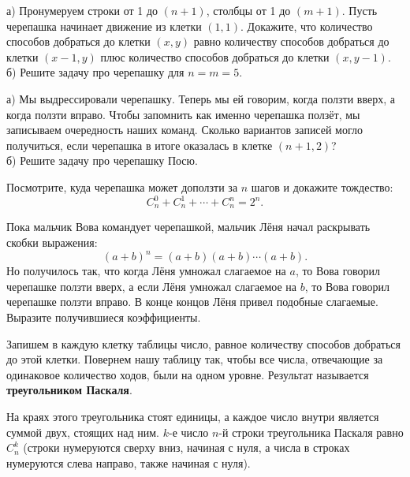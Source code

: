 \begin{problems}
 
\item а) Пронумеруем строки от 1 до $(n+1)$, столбцы от 1 до $(m+1)$. Пусть черепашка начинает движение из клетки $(1, 1)$. Докажите, что количество способов добраться до клетки $(x, y)$ равно количеству способов добраться до клетки $(x-1, y)$ плюс количество способов добраться до клетки $(x, y-1)$.\\
б) Решите задачу про черепашку для $n=m=5$.

\item а) Мы выдрессировали черепашку. Теперь мы ей говорим, когда ползти вверх, а когда ползти вправо. Чтобы запомнить как именно черепашка ползёт, мы записываем очередность наших команд. Сколько вариантов записей могло получиться, если черепашка в итоге оказалась в клетке $(n+1, 2)$?\\
б) Решите задачу про черепашку Посю.

\item Посмотрите, куда черепашка может доползти за $n$ шагов и докажите тождество:
$$C_n^0+C_n^1+\cdots+C_n^n=2^n.$$

\item Пока мальчик Вова командует черепашкой, мальчик Лёня начал раскрывать скобки выражения:
$$(a+b)^n=(a+b)(a+b)\cdots (a+b).$$
Но получилось так, что когда Лёня умножал слагаемое на $a$, то Вова говорил черепашке ползти вверх, а если Лёня умножал слагаемое на $b$, то Вова говорил черепашке ползти вправо. В конце концов Лёня привел подобные слагаемые. Выразите получившиеся коэффициенты. 
\end{problems}

Запишем в каждую клетку таблицы число, равное количеству способов добраться до этой клетки. Повернем нашу таблицу так, чтобы все числа, отвечающие за одинаковое количество ходов, были на одном уровне. Результат называется \textbf{треугольником Паскаля}.

На краях этого треугольника стоят единицы, а каждое число внутри является суммой двух, стоящих над ним. $k$-е число $n$-й строки треугольника Паскаля равно $C_n^k$ (строки нумеруются сверху вниз, начиная с нуля, а числа в строках нумеруются слева направо, также начиная с нуля).

\begin{figure}[h!]
\end{figure}


